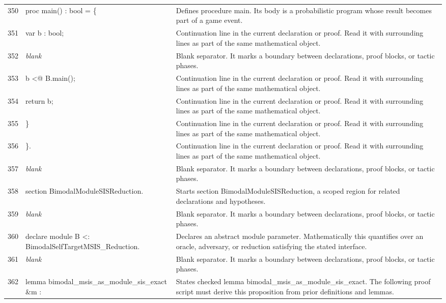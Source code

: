 \documentclass[10pt]{article}
\begin{document}
\begin{longtable}{r L{0.53\textwidth} L{0.37\textwidth}}
350 & {\ttfamily\scriptsize   proc main() : bool = \{} & Defines procedure main.  Its body is a probabilistic program whose result becomes part of a game event. \\
351 & {\ttfamily\scriptsize     var b : bool;} & Continuation line in the current declaration or proof.  Read it with surrounding lines as part of the same mathematical object. \\
352 & {\ttfamily\scriptsize \emph{blank}} & Blank separator.  It marks a boundary between declarations, proof blocks, or tactic phases. \\
353 & {\ttfamily\scriptsize     b <@ B.main();} & Continuation line in the current declaration or proof.  Read it with surrounding lines as part of the same mathematical object. \\
354 & {\ttfamily\scriptsize     return b;} & Continuation line in the current declaration or proof.  Read it with surrounding lines as part of the same mathematical object. \\
355 & {\ttfamily\scriptsize   \}} & Continuation line in the current declaration or proof.  Read it with surrounding lines as part of the same mathematical object. \\
356 & {\ttfamily\scriptsize \}.} & Continuation line in the current declaration or proof.  Read it with surrounding lines as part of the same mathematical object. \\
357 & {\ttfamily\scriptsize \emph{blank}} & Blank separator.  It marks a boundary between declarations, proof blocks, or tactic phases. \\
358 & {\ttfamily\scriptsize section BimodalModuleSISReduction.} & Starts section BimodalModuleSISReduction, a scoped region for related declarations and hypotheses. \\
359 & {\ttfamily\scriptsize \emph{blank}} & Blank separator.  It marks a boundary between declarations, proof blocks, or tactic phases. \\
360 & {\ttfamily\scriptsize declare module B <: BimodalSelfTargetMSIS\_Reduction.} & Declares an abstract module parameter.  Mathematically this quantifies over an oracle, adversary, or reduction satisfying the stated interface. \\
361 & {\ttfamily\scriptsize \emph{blank}} & Blank separator.  It marks a boundary between declarations, proof blocks, or tactic phases. \\
362 & {\ttfamily\scriptsize lemma bimodal\_msis\_as\_module\_sis\_exact \&m :} & States checked lemma bimodal\_msis\_as\_module\_sis\_exact.  The following proof script must derive this proposition from prior definitions and lemmas. \\

\end{longtable}
\end{document}
